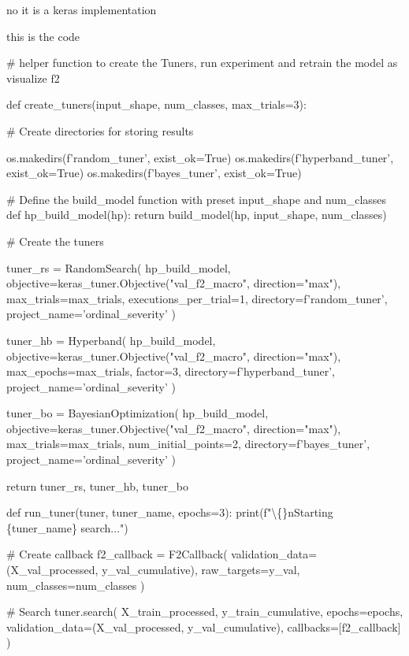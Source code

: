 \begin{userprompt}
no it is a keras implementation

this is the code

\# helper function to create the Tuners, run experiment and retrain the model as visualize f2

def create\_tuners(input\_shape, num\_classes, max\_trials=3):

\# Create directories for storing results

    os.makedirs(f'random\_tuner', exist\_ok=True)
    os.makedirs(f'hyperband\_tuner', exist\_ok=True)
    os.makedirs(f'bayes\_tuner', exist\_ok=True)

\# Define the build\_model function with preset input\_shape and num\_classes
    def hp\_build\_model(hp):
        return build\_model(hp, input\_shape, num\_classes)

\# Create the tuners

    tuner\_rs = RandomSearch(
        hp\_build\_model,
        objective=keras\_tuner.Objective("val\_f2\_macro", direction="max"),
        max\_trials=max\_trials,
        executions\_per\_trial=1,
        directory=f'random\_tuner',
        project\_name='ordinal\_severity'
    )

tuner\_hb = Hyperband(
        hp\_build\_model,
        objective=keras\_tuner.Objective("val\_f2\_macro", direction="max"),
        max\_epochs=max\_trials,
        factor=3,
        directory=f'hyperband\_tuner',
        project\_name='ordinal\_severity'
    )

tuner\_bo = BayesianOptimization(
        hp\_build\_model,
        objective=keras\_tuner.Objective("val\_f2\_macro", direction="max"),
        max\_trials=max\_trials,
        num\_initial\_points=2,
        directory=f'bayes\_tuner',
        project\_name='ordinal\_severity'
    )

return tuner\_rs, tuner\_hb, tuner\_bo

def run\_tuner(tuner, tuner\_name, epochs=3):
    print(f"\textbackslash\{\}nStarting \{tuner\_name\} search...")

\# Create callback
    f2\_callback = F2Callback(
        validation\_data=(X\_val\_processed, y\_val\_cumulative),
        raw\_targets=y\_val,
        num\_classes=num\_classes
    )

\# Search
    tuner.search(
        X\_train\_processed, y\_train\_cumulative,
        epochs=epochs,
        validation\_data=(X\_val\_processed, y\_val\_cumulative),
        callbacks=[f2\_callback]
    )


\end{userprompt}
